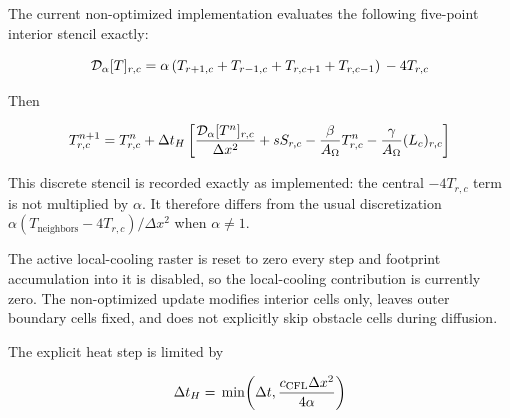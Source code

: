 \documentclass[11pt]{article}
\begin{document}
The current non-optimized implementation evaluates the following five-point interior stencil exactly:


\begin{equation}
\mathcal D_\alpha[T]_{r,c} \\
= \\
\alpha \\
\left( \\
T_{r+1,c}+T_{r-1,c}+T_{r,c+1}+T_{r,c-1} \\
\right) \\
- \\
4T_{r,c}
\end{equation}


Then


\begin{equation}
T_{r,c}^{n+1} \\
= \\
T_{r,c}^{n} \\
+ \\
\Delta t_H \\
\left[ \\
\frac{\mathcal D_\alpha[T^n]_{r,c}}{\Delta x^2} \\
+ \\
sS_{r,c} \\
- \\
\frac{\beta}{A_\Omega}T_{r,c}^n \\
- \\
\frac{\gamma}{A_\Omega}(L_c)_{r,c} \\
\right]
\end{equation}


This discrete stencil is recorded exactly as implemented: the central $-4T_{r,c}$ term is not multiplied by $\alpha$. It therefore differs from the usual discretization $\alpha(T_{\mathrm{neighbors}}-4T_{r,c})/\Delta x^2$ when $\alpha\ne1$.


The active local-cooling raster is reset to zero every step and footprint accumulation into it is disabled, so the local-cooling contribution is currently zero. The non-optimized update modifies interior cells only, leaves outer boundary cells fixed, and does not explicitly skip obstacle cells during diffusion.


The explicit heat step is limited by


\begin{equation}
\Delta t_H \\
= \\
\min\!\left( \\
\Delta t, \\
\frac{c_{\mathrm{CFL}}\Delta x^2}{4\alpha} \\
\right)
\end{equation}
\end{document}
